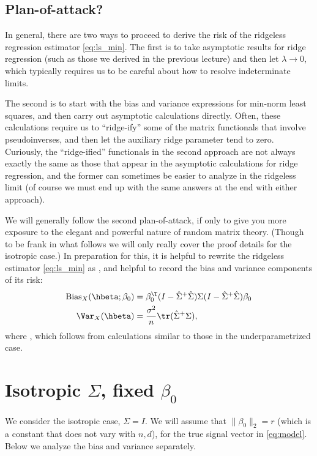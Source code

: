 \documentclass{article}
\begin{document}
\subsection{Plan-of-attack?}

In general, there are two ways to proceed to derive the risk of the ridgeless
regression estimator \eqref{eq:ls_min}. The first is to take asymptotic results
for ridge regression (such as those we derived in the previous lecture) and then
let $\lambda \to 0$, which typically requires us to be careful about how to
resolve indeterminate limits. 

The second is to start with the bias and variance expressions for min-norm 
least squares, and then carry out asymptotic calculations directly. Often, these
calculations require us to ``ridge-ify'' some of the matrix functionals
that involve pseudoinverses, and then let the auxiliary ridge parameter tend to
zero. Curiously, the ``ridge-ified'' functionals in the second approach are not
always exactly the same as those that appear in the asymptotic calculations for
ridge regression, and the former can sometimes be easier to analyze in the
ridgeless limit (of course we must end up with the same answers at the end with
either approach).   

We will generally follow the second plan-of-attack, if only to give you more
exposure to the elegant and powerful nature of random matrix theory. (Though to
be frank in what follows we will only really cover the proof details for the 
isotropic case.) In preparation for this, it is helpful to rewrite the ridgeless
estimator  \eqref{eq:ls_min} as , and
helpful to record the bias and variance components of its risk:  
\begin{align}
\label{eq:ls_min_bias}
\Bias_X(\hbeta; \beta_0) &= \beta_0^\T (I - \hSigma^+ \hSigma) \Sigma 
  (I - \hSigma^+ \hSigma) \beta_0 \\  
\label{eq:ls_min_var}
\Var_X(\hbeta) &= \frac{\sigma^2}{n} \tr (\hSigma^+ \Sigma),
\end{align}
where , which follows from calculations similar to
those in the underparametrized case.      

\section{Isotropic $\Sigma$, fixed $\beta_0$}

We consider the isotropic case, $\Sigma = I$.  We will assume that $\|\beta_0\|_2
= r$ (which is a constant that does not vary with $n,d$), for the true signal
vector in \eqref{eq:model}. Below we analyze the bias and variance separately.
\end{document}
